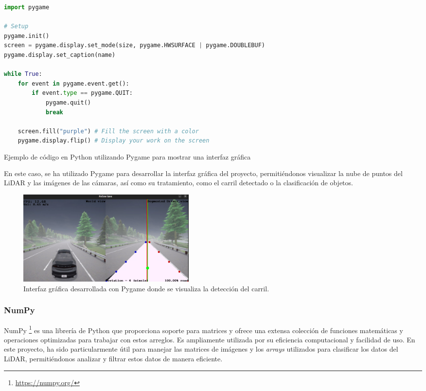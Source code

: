 \begin{code}[h]
\begin{lstlisting}[language=Python]
import pygame
	
# Setup
pygame.init()
screen = pygame.display.set_mode(size, pygame.HWSURFACE | pygame.DOUBLEBUF)
pygame.display.set_caption(name)

while True:
    for event in pygame.event.get():
        if event.type == pygame.QUIT:
            pygame.quit()
            break

    screen.fill("purple") # Fill the screen with a color
    pygame.display.flip() # Display your work on the screen
\end{lstlisting}
\caption[Ejemplo de código en Python utilizando Pygame]{Ejemplo de código en Python utilizando Pygame para mostrar una interfaz gráfica}
\label{cod:pygame}
\end{code}

 En este caso, se ha utilizado Pygame para desarrollar la interfaz gráfica del proyecto, permitiéndonos visualizar la nube de puntos del \ac{LiDAR} y las imágenes de las cámaras, así como su tratamiento, como el carril detectado o la clasificación de objetos.

\begin{figure}[ht]
  \begin{center}
    \includegraphics[width=9cm]{figs/Plataformas_Desarollo/pygame.png}
  \end{center}
  \caption{Interfaz gráfica desarrollada con Pygame donde se visualiza la detección del carril.}
  \label{foto_pygame}
\end{figure}

\subsubsection{NumPy}
\label{sec:numpy}

NumPy \footnote{\url{https://numpy.org/}} es una librería de Python que proporciona soporte para matrices y ofrece una extensa colección de funciones matemáticas y operaciones optimizadas para trabajar con estos arreglos. Es ampliamente utilizada por su eficiencia computacional y facilidad de uso. En este proyecto, ha sido particularmente útil para manejar las matrices de imágenes y los \textit{arrays} utilizados para clasificar los datos del \ac{LiDAR}, permitiéndonos analizar y filtrar estos datos de manera eficiente.

